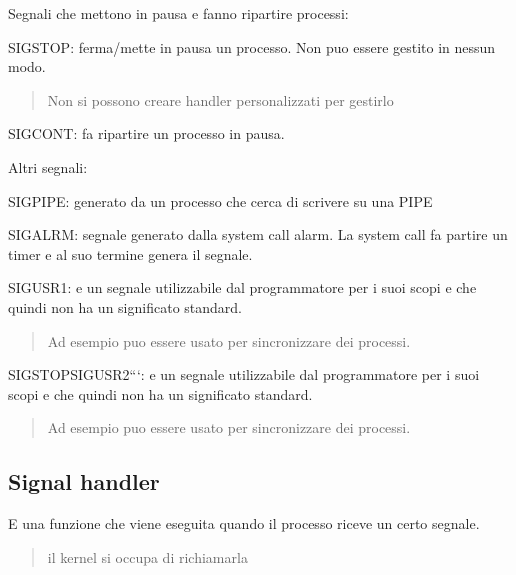 Segnali che mettono in pausa e fanno ripartire processi\+:
\begin{DoxyItemize}
\item {\ttfamily S\+I\+G\+S\+T\+OP}\+: ferma/mette in pausa un processo. Non puo\textquotesingle{} essere gestito in nessun modo. \begin{quote}
Non si possono creare handler personalizzati per gestirlo \end{quote}

\item {\ttfamily S\+I\+G\+C\+O\+NT}\+: fa ripartire un processo in pausa.
\end{DoxyItemize}

Altri segnali\+:
\begin{DoxyItemize}
\item {\ttfamily S\+I\+G\+P\+I\+PE}\+: generato da un processo che cerca di scrivere su una P\+I\+PE
\item {\ttfamily S\+I\+G\+A\+L\+RM}\+: segnale generato dalla system call alarm. La system call fa partire un timer e al suo termine genera il segnale.
\item {\ttfamily S\+I\+G\+U\+S\+R1}\+: e\textquotesingle{} un segnale utilizzabile dal programmatore per i suoi scopi e che quindi non ha un significato standard. \begin{quote}
Ad esempio puo\textquotesingle{} essere usato per sincronizzare dei processi. \end{quote}

\item {\ttfamily S\+I\+G\+S\+T\+OP}S\+I\+G\+U\+S\+R2```\+: e\textquotesingle{} un segnale utilizzabile dal programmatore per i suoi scopi e che quindi non ha un significato standard. \begin{quote}
Ad esempio puo\textquotesingle{} essere usato per sincronizzare dei processi. \end{quote}

\end{DoxyItemize}

\subsection*{Signal handler}

E\textquotesingle{} una funzione che viene eseguita quando il processo riceve un certo segnale. \begin{quote}
il kernel si occupa di richiamarla \end{quote}


